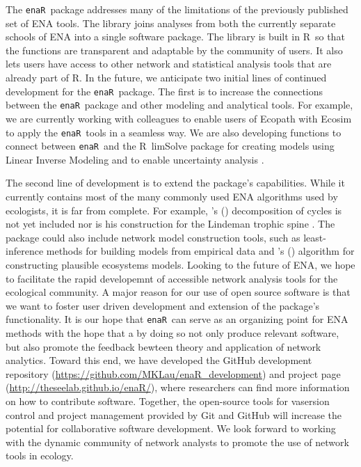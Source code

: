 \documentclass[11pt]{article}
\def\citeapos#1{\citeauthor{#1}'s (\citeyear{#1})}
\newcommand{\R}{R}
\newcommand{\enaR}{\texttt{enaR}}
\begin{document}
\begin{spacing}{2}
The \enaR\ package addresses many of the limitations of the previously
published set of ENA tools. The library joins analyses from both the
currently separate schools of ENA into a single software package.
The library is built in \R\ so that the functions are transparent and
adaptable by the community of users.  It also lets users have access
to other network and statistical analysis tools that are already part
of \R. 
%
In the future, we anticipate two initial lines of continued
development for the \enaR\ package. The first is to increase the
connections between the \enaR\ package and other modeling and
analytical tools.  For example, we are currently working with
colleagues to enable users of Ecopath with Ecosim
\citep{christensen04} to apply the \enaR\ tools in a seamless way.  We
are also developing functions to connect between \enaR\ and the
\R\ limSolve package \citep{soetaert09} for creating models using
Linear Inverse Modeling and to enable uncertainty analysis
\citep{kones09}.

The second line of development is to extend the package's
capabilities.  While it currently contains most of the many commonly
used ENA algorithms used by ecologists, it is far from complete. For
example, \citeapos{ulanowicz83} decomposition of cycles is not yet
included nor is his construction for the Lindeman trophic spine
\citep{ulanowicz1979trophic}. The package could also include network
model construction tools, such as least-inference methods for building
models from empirical data \citep{ulanowicz2008least} and
\citeapos{fath04_cyber} algorithm for constructing plausible
ecosystems models.
%
Looking to the future of ENA, we hope to facilitate the rapid
developemnt of accessible network analysis tools for the ecological
community. A major reason for our use of open source software is that
we want to foster user driven development and extension of the
package's functionality. It is our hope that \enaR\ can serve as an
organizing point for ENA methods with the hope that a by doing so not
only produce relevant software, but also promote the feedback bewteen
theory and application of network analytics. Toward this end, we have
developed the GitHub development repository
(\url{https://github.com/MKLau/enaR_development}) and project page
(\url{http://theseelab.github.io/enaR/}), where researchers can find
more information on how to contribute software. Together, the
open-source tools for vasersion control and project management
provided by Git and GitHub will increase the potential for
collaborative software development. We look forward to working with
the dynamic community of network analysts to promote the use of
network tools in ecology.


\end{spacing}
\end{document}
